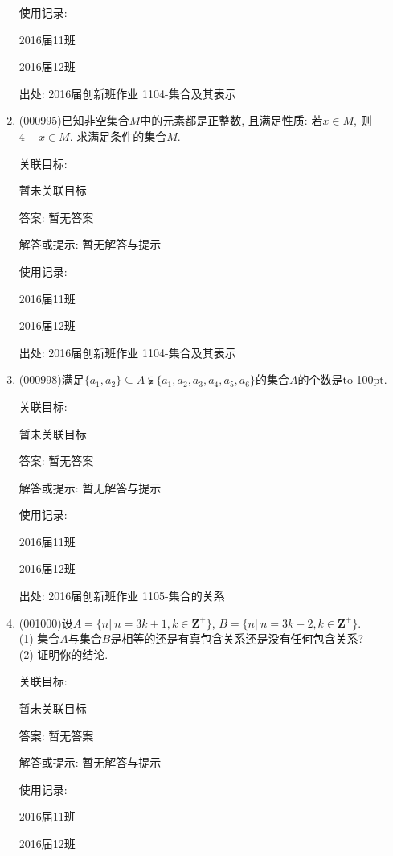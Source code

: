 \documentclass[10pt,a4paper]{article}
\newcommand{\blank}[1]{\underline{\hbox to #1pt{}}}
\begin{document}
\begin{enumerate}[1.]
使用记录:

2016届11班	

2016届12班	


出处: 2016届创新班作业	1104-集合及其表示
\item { (000995)}已知非空集合$M$中的元素都是正整数, 且满足性质: 若$x\in M$, 则$4-x\in M$. 求满足条件的集合$M$.


关联目标:

暂未关联目标

答案: 暂无答案

解答或提示: 暂无解答与提示

使用记录:

2016届11班	

2016届12班	


出处: 2016届创新班作业	1104-集合及其表示
\item { (000998)}满足$\{a_1,a_2\}\subseteq A\subsetneqq\{a_1,a_2,a_3,a_4,a_5,a_6\}$的集合$A$的个数是\blank{100}.


关联目标:

暂未关联目标

答案: 暂无答案

解答或提示: 暂无解答与提示

使用记录:

2016届11班	

2016届12班	


出处: 2016届创新班作业	1105-集合的关系
\item { (001000)}设$A=\{n|\ n=3k+1,k \in \mathbf{Z}^+\}$, $B=\{n|\ n=3k-2,k \in \mathbf{Z}^+\}$.\\ 
(1) 集合$A$与集合$B$是相等的还是有真包含关系还是没有任何包含关系?\\ 
(2) 证明你的结论.


关联目标:

暂未关联目标

答案: 暂无答案

解答或提示: 暂无解答与提示

使用记录:

2016届11班		

2016届12班		



\end{enumerate}
\end{document}
